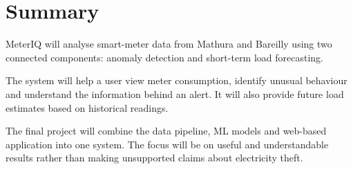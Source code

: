 \documentclass[11pt,a4paper]{article}
\begin{document}
\section{Summary}

MeterIQ will analyse smart-meter data from Mathura and Bareilly using
two connected components: anomaly detection and short-term load
forecasting.

The system will help a user view meter consumption, identify unusual
behaviour and understand the information behind an alert. It will
also provide future load estimates based on historical readings.

The final project will combine the data pipeline, ML models and
web-based application into one system. The focus will be on useful
and understandable results rather than making unsupported claims
about electricity theft.
\end{document}
